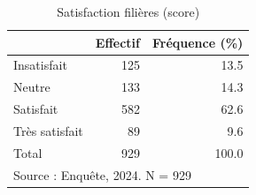 \begin{table}[htbp]\centering
\def\sym#1{\ifmmode^{#1}\else\(^{#1}\)\fi}
\caption{Satisfaction filières (score)}
\begin{tabular}{l*{2}{r}}
\toprule
            &    Effectif&Fréquence (\%)\\
\midrule
Insatisfait &         125&        13.5\\
Neutre      &         133&        14.3\\
Satisfait   &         582&        62.6\\
Très satisfait&          89&         9.6\\
Total       &         929&       100.0\\
\bottomrule
\multicolumn{3}{l}{\footnotesize Source : Enquête, 2024. N = 929}\\
\end{tabular}
\end{table}
